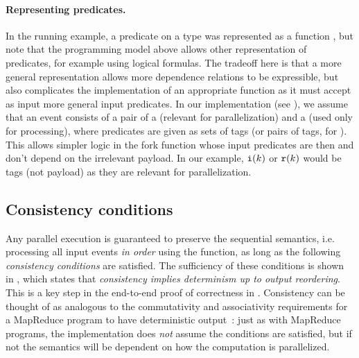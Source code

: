 \paragraph{Representing predicates.}
In the running example, a predicate on a type  was represented
as a function , but note that the programming model above allows other
representation of predicates, for example using logical formulas.
The tradeoff here is that a more general representation allows
more dependence relations to be expressible, but also complicates the
implementation of an appropriate  function as it must accept
as input more general input predicates.
In our implementation (see ), we assume
that an event consists of a pair of a  (relevant for parallelization) and a  (used only for processing),
where predicates are given as sets of tags (or pairs of tags, for ).
This allows simpler logic in the fork function whose input predicates
are then  and don't depend on the irrelevant payload.
In our example, $\texttt{i}(k)$ or $\texttt{r}(k)$ would be tags (not payload)
as they are relevant for parallelization.

\subsection{Consistency conditions}
\label{dgs:ssec:prog-model-correctness}

Any parallel execution
is guaranteed to preserve the sequential semantics, i.e. processing
all input events \emph{in order} using the  function,
as long as the following \emph{consistency conditions} are
satisfied.
The sufficiency of these conditions is shown in
, which states
that \emph{consistency implies determinism up to output reordering}.
This is a key step in the end-to-end proof of correctness in .
Consistency can be thought of as analogous to the commutativity and
associativity requirements for a MapReduce program to have
deterministic output~\cite{dean2008mapreduce}: just as with MapReduce
programs, the implementation does \emph{not} assume the conditions are
satisfied, but if not the semantics will be dependent on how the
computation is parallelized.

